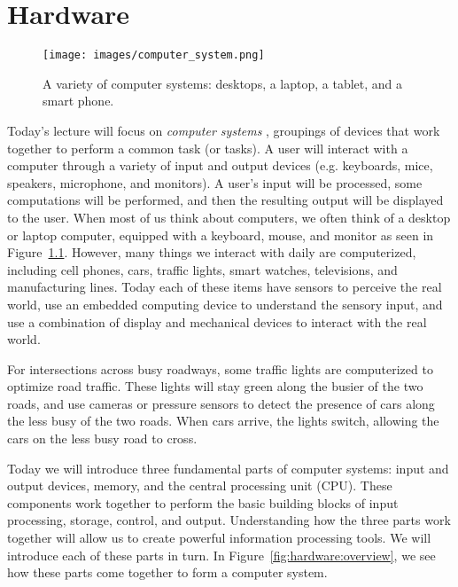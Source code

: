 \chapter{Hardware}

\begin{figure}
	\centering
	\texttt{[image: images/computer\_system.png]}
	\caption{A variety of computer systems: desktops, a laptop, a tablet, and a
    smart phone. }
	\label{fig:hardware:computers}
\end{figure}

Today's lecture will focus on \emph{computer systems} , groupings of devices that work together to perform a common
task (or tasks). A user will interact with a computer through a variety of input
and output devices (e.g. keyboards, mice, speakers, microphone, and monitors). A
user's input will be processed, some computations will be performed, and then
the resulting output will be displayed to the user. When most of us think about
computers, we often think of a desktop or laptop computer, equipped with a
keyboard, mouse, and monitor as seen in Figure~\ref{fig:hardware:computers}.
However, many things we interact with daily are computerized, including cell
phones, cars, traffic lights, smart watches, televisions, and manufacturing
lines. Today each of these items have sensors to perceive the real world, use an
embedded computing device to understand the sensory input, and use a combination
of display and mechanical devices to interact with the real world.

\begin{example}
  For intersections across busy roadways, some traffic lights are computerized
  to optimize road traffic. These lights will stay green along the busier of the
  two roads, and use cameras or pressure sensors to detect the presence of cars
  along the less busy of the two roads. When cars arrive, the lights switch,
  allowing the cars on the less busy road to cross.
\end{example}

Today we will introduce three fundamental parts of computer systems:
input and output devices, memory, and the central processing unit (CPU).
These components work together to perform the basic building blocks of
input processing, storage, control, and output. Understanding how the
three parts work together will allow us to create powerful information
processing tools. We will introduce each of these parts in turn.
In Figure~\ref{fig:hardware:overview}, we see how these parts come
together to form a computer system.


